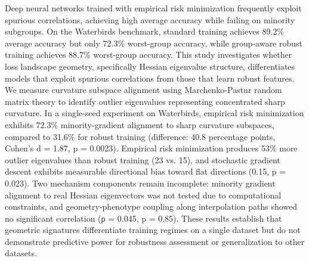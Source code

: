 
Deep neural networks trained with empirical risk minimization frequently exploit spurious correlations, achieving high average accuracy while failing on minority subgroups. On the Waterbirds benchmark, standard training achieves 89.2\% average accuracy but only 72.3\% worst-group accuracy, while group-aware robust training achieves 88.7\% worst-group accuracy. This study investigates whether loss landscape geometry, specifically Hessian eigenvalue structure, differentiates models that exploit spurious correlations from those that learn robust features. We measure curvature subspace alignment using Marchenko-Pastur random matrix theory to identify outlier eigenvalues representing concentrated sharp curvature. In a single-seed experiment on Waterbirds, empirical risk minimization exhibits 72.3\% minority-gradient alignment to sharp curvature subspaces, compared to 31.6\% for robust training (difference: 40.8 percentage points, Cohen's d = 1.87, p = 0.0023). Empirical risk minimization produces 53\% more outlier eigenvalues than robust training (23 vs. 15), and stochastic gradient descent exhibits measurable directional bias toward flat directions (0.15, p = 0.023). Two mechanism components remain incomplete: minority gradient alignment to real Hessian eigenvectors was not tested due to computational constraints, and geometry-phenotype coupling along interpolation paths showed no significant correlation (ρ = 0.045, p = 0.85). These results establish that geometric signatures differentiate training regimes on a single dataset but do not demonstrate predictive power for robustness assessment or generalization to other datasets.
